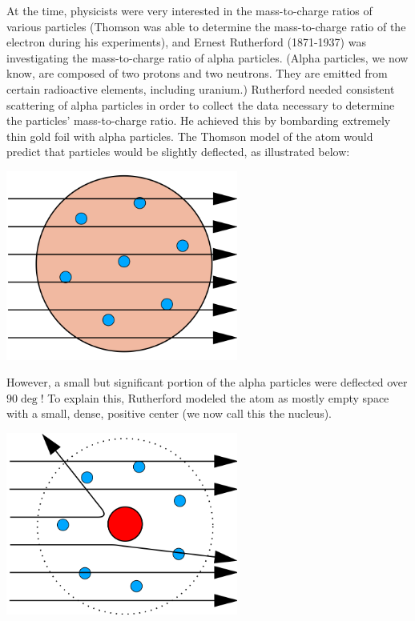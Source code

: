 At the time, physicists were very interested in the mass-to-charge ratios of
various particles (Thomson was able to determine the mass-to-charge ratio of the
electron during his experiments), and Ernest Rutherford (1871-1937) was
investigating the mass-to-charge ratio of alpha particles. (Alpha particles, we
now know, are composed of two protons and two neutrons. They are emitted from
certain radioactive elements, including uranium.) Rutherford needed consistent
scattering of alpha particles in order to collect the data necessary to determine
the particles' mass-to-charge ratio. He achieved this by bombarding extremely
thin gold foil with alpha particles. The Thomson model of the atom would predict
that particles would be slightly deflected, as illustrated below:

\begin{center}
\includegraphics[width=3in]{thomson_gold.png}
\end{center}

However, a small but significant portion of the alpha particles were deflected
over $90 \deg$! To explain this, Rutherford modeled the atom as mostly empty
space with a small, dense, positive center (we now call this the nucleus).

\begin{center}
\includegraphics[width=3in]{rutherford_gold.png}
\end{center}

